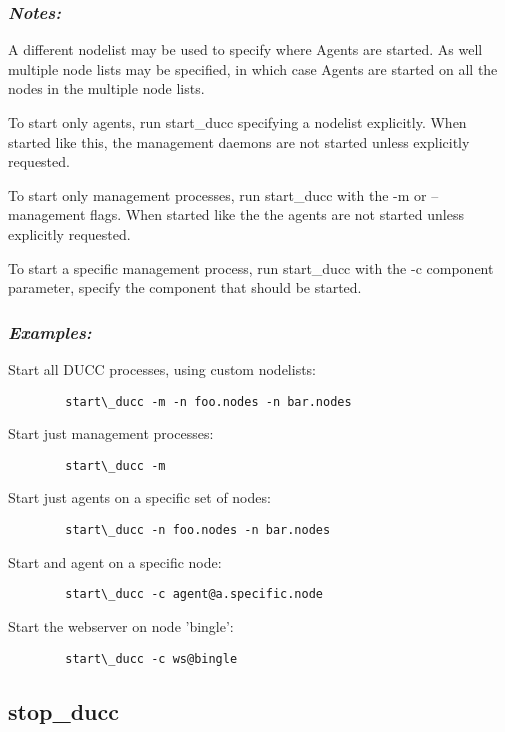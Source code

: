       \subsubsection{{\em Notes: }}
      A different nodelist may be used to specify where Agents are started. As well multiple node 
      lists may be specified, in which case Agents are started on all the nodes in the multiple node 
      lists. 
      
      To start only agents, run start\_ducc specifying a nodelist explicitly. When started like this, the 
      management daemons are not started unless explicitly requested. 
      
      To start only management processes, run start\_ducc with the -m or --management flags. When 
      started like the the agents are not started unless explicitly requested. 
      
      To start a specific management process, run start\_ducc with the -c component parameter, 
      specify the component that should be started. 
  
      \subsubsection{{\em Examples: }}

      Start all DUCC processes, using custom nodelists: 
\begin{verbatim}
        start\_ducc -m -n foo.nodes -n bar.nodes 
\end{verbatim}
      
      Start just management processes: 
\begin{verbatim}
        start\_ducc -m 
\end{verbatim}
      
      Start just agents on a specific set of nodes: 
\begin{verbatim}
        start\_ducc -n foo.nodes -n bar.nodes 
\end{verbatim}
      
      Start and agent on a specific node: 
\begin{verbatim}
        start\_ducc -c agent@a.specific.node 
\end{verbatim}
      
      Start the webserver on node 'bingle': 
\begin{verbatim}
        start\_ducc -c ws@bingle 
\end{verbatim}

    
\subsection{stop\_ducc}


